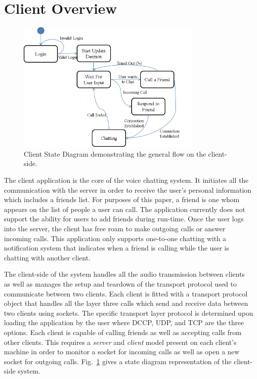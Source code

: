 
\section{Client Overview}
\label{sec:client_des}

\begin{figure}[!t]
   \centering
      \includegraphics[width=0.8\textwidth]{pics/Client_StateDiagram}
   \caption{Client State Diagram demonstrating the general flow on the client-side.}
\label{fig:client_state_diag}
\end{figure}

The client application is the core of the voice chatting system.  It initiates all
the communication with the server in order to receive the user's personal 
information which includes a friends list. For purposes of this paper, a friend
is one whom appears on the list of people a user can call. The application currently
does not support the ability for users to add friends during run-time.  Once the 
user logs into the server,
the client has free roam to make outgoing calls or answer incoming calls.  This
application only supports one-to-one chatting with a notification system that 
indicates when a friend is calling while the user is chatting with another client.  

The client-side of the system handles all the audio transmission between clients
as well as manages the setup and teardown of the transport protocol used to
communicate between two clients.  Each client is fitted with a transport protocol
object that handles all the layer three calls which send and receive data between
two clients using sockets.  The specific transport layer protocol is determined
upon loading the application by the user where DCCP, UDP, and TCP are the three
options. Each client is capable of calling friends as well as accepting calls from
other clients.  This requires a \textit{server} and \textit{client} model present
on each client's machine in order to monitor a socket for incoming calls as well
as open a new socket for outgoing calls.  Fig.~\ref{fig:client_state_diag} gives 
a state diagram representation of the client-side system.


